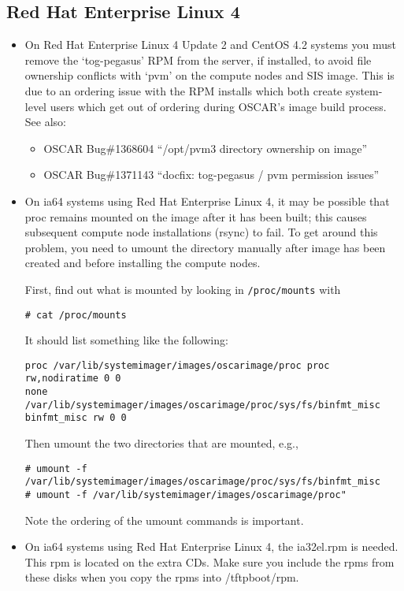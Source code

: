 
\subsection{Red Hat Enterprise Linux 4}
\label{subsec:rhel4notes}

\begin{itemize}

\item On Red Hat Enterprise Linux 4 Update 2 and CentOS 4.2 systems you 
      must remove the `tog-pegasus' RPM from the server, if installed, to 
      avoid file ownership conflicts with `pvm' on the compute nodes and SIS 
      image.  This is due to an ordering issue with the RPM installs which 
      both create system-level users which get out of ordering during OSCAR's 
      image build process.  See also:
      \begin{itemize}
		\item OSCAR Bug\#1368604 ``/opt/pvm3 directory ownership on image''
		\item OSCAR Bug\#1371143 ``docfix: tog-pegasus / pvm permission issues''
      \end{itemize}

\item On ia64 systems using Red Hat Enterprise Linux 4, it may be possible
  that proc remains mounted
  on the image after it has been built; this causes subsequent compute node
  installations (rsync) to fail.  To get around this problem, you need to
  umount the directory manually after image has been created and before
  installing the compute nodes.
 
  First, find out what is mounted by looking in {\tt /proc/mounts} with
  \begin{verbatim}
# cat /proc/mounts
  \end{verbatim}
  It should list something like the following:
  \begin{verbatim}
proc /var/lib/systemimager/images/oscarimage/proc proc rw,nodiratime 0 0
none /var/lib/systemimager/images/oscarimage/proc/sys/fs/binfmt_misc
binfmt_misc rw 0 0
  \end{verbatim}
  Then umount the two directories that are mounted, e.g.,
  \begin{verbatim}
# umount -f /var/lib/systemimager/images/oscarimage/proc/sys/fs/binfmt_misc
# umount -f /var/lib/systemimager/images/oscarimage/proc"
  \end{verbatim}
  Note the ordering of the umount commands is important.

\item On ia64 systems using Red Hat Enterprise Linux 4, the ia32el.rpm is
  needed.  This rpm is located on the extra CDs.  Make sure you include
  the rpms from these disks when you copy the rpms into /tftpboot/rpm.

\end{itemize}

